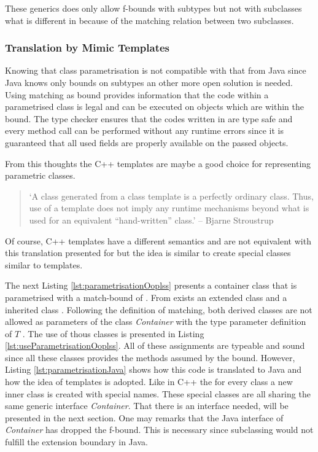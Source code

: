 These generics does only allow f-bounds with subtypes but not with
subclasses what is different in \ooplss because of the matching relation
between two subclasses.

\subsubsection{Translation by Mimic Templates}
Knowing that \ooplss class parametrisation is not compatible with that
from Java since Java knows only bounds on subtypes an other more open
solution is needed.  Using matching as bound provides information that
the code within a parametrised class is legal and can be executed on
objects which are within the bound. The type checker ensures that the
codes written in \ooplss are type safe and every method call can be
performed without any runtime errors since it is guaranteed that all
used fields are properly available on the passed objects.

From this thoughts the C++ templates are maybe a good choice for
representing parametric classes.

\begin{quotation}
`A class generated from a class template is a perfectly ordinary
class. Thus, use of a template does not imply any runtime mechanisms
beyond what is used for an equivalent ``hand-written'' class.' -- Bjarne
Stroustrup \cite{stroustrup_c++_2000}
\end{quotation}

Of course, C++ templates have a different semantics and are not equivalent
with this translation presented for \ooplss but the idea is similar to
create special classes similar to templates.

The next Listing \ref{lst:parametrisationOoplss} presents a container
class that is parametrised with a match-bound of \A. From \A exists an
extended class \B and a inherited class \C. Following the definition
of matching, both derived classes are not allowed as parameters
of the class \emph{Container} with the type parameter definition
of $T$ \match \A.  The use of thous classes is presented in Listing
\ref{lst:useParametrisationOoplss}. All of these assignments are typeable
and sound since all these classes provides the methods assumed by the
bound. However, Listing \ref{lst:parametrisationJava} shows how this code
is translated to Java and how the idea of templates is adopted. Like
in C++ the for every class a new inner class is created with special
names. These special classes are all sharing the same generic interface
\emph{Container}. That there is an interface needed, will be presented
in the next section. One may remarks that the Java interface of
\emph{Container} has dropped the f-bound. This is necessary since
subclassing would not fulfill the extension boundary in Java.

